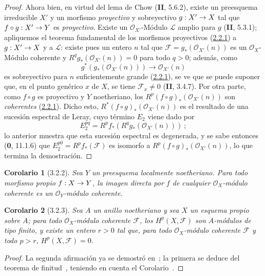 \documentclass[10pt,oneside,openany]{book}
\theoremstyle{egaenv}\newtheorem*{env}{---}
\theoremstyle{egastatement}
\newtheorem*{corollary}{Corolario}
\theoremstyle{egadescription}
\renewcommand{\to}{\mathchoice{\longrightarrow}{\rightarrow}{\rightarrow}{\rightarrow}}
\begin{document}
\begin{proof}
Ahora bien, en virtud del lema de Chow (\textbf{II}, 5.6.2), existe un preesquema
irreducible $X'$ y un morfismo \emph{proyectivo} y sobreyectivo
$g:X'\to X$ tal que $f\circ g:X'\to Y$ es \emph{proyectivo}. Existe un
$\mathcal O_{X'}$-Módulo $\mathcal L$ amplio para $g$ (\textbf{II}, 5.3.1);
apliquemos el teorema fundamental de los morfismos proyectivos
(\hyperref[III.2.2.1-fr]{2.2.1}) a $g:X'\to X$ y a $\mathcal L$:
existe pues un entero $n$ tal que
$\mathcal F=g_*(\mathcal O_{X'}(n))$ es un $\mathcal O_X$-Módulo coherente
y $R^qg_*(\mathcal O_{X'}(n))=0$ para todo $q>0$; además, como
\[
g^*(g_*(\mathcal O_{X'}(n)))\longrightarrow\mathcal O_{X'}(n)
\]
es sobreyectivo para $n$ suficientemente grande (\hyperref[III.2.2.1-fr]{2.2.1}), se
ve que se puede suponer que, en el punto genérico $x$ de $X$, se tiene
$\mathcal F_x\neq0$ (\textbf{II}, 3.4.7). Por otra parte, como $f\circ g$ es
proyectivo y $Y$ noetheriano, los
$R^p(f\circ g)_*(\mathcal O_{X'}(n))$ son \emph{coherentes}
(\hyperref[III.2.2.1-fr]{2.2.1}). Dicho esto,
$R^*(f\circ g)_*(\mathcal O_{X'}(n))$ es el resultado de una sucesión
espectral de Leray, cuyo término $E_2$ viene dado por
\[
E_2^{pq}=R^pf_*(R^qg_*(\mathcal O_{X'}(n)))~;
\]
lo anterior muestra que esta sucesión espectral es degenerada, y se sabe
entonces (\textbf{0}, 11.1.6) que $E_2^{p0}=R^pf_*(\mathcal F)$ es isomorfo a
$R^p(f\circ g)_*(\mathcal O_{X'}(n))$, lo que termina la demostración.
\end{proof}

\begin{corollary}[3.2.2]
\label{III.3.2.2}
\label{III.3.2.2-fr}
Sea $Y$ un preesquema localmente noetheriano.
Para todo morfismo propio $f:X\to Y$, la imagen directa por $f$ de cualquier $\mathcal O_X$-módulo coherente es un $\mathcal O_Y$-módulo coherente.
\end{corollary}

\begin{corollary}[3.2.3]
\label{III.3.2.3}
\label{III.3.2.3-fr}
Sea $A$ un anillo noetheriano y sea $X$ un esquema propio sobre $A$; para todo $\mathcal O_X$-módulo coherente $\mathcal F$, los $H^p(X,\mathcal F)$ son $A$-módulos de tipo finito, y existe un entero $r>0$ tal que, para todo $\mathcal O_X$-módulo coherente $\mathcal F$ y todo $p>r$, $H^p(X,\mathcal F)=0$.
\end{corollary}

\begin{proof}
La segunda afirmación ya se demostró en~; la primera se deduce del teorema de finitud~, teniendo en cuenta el Corolario~.
\end{proof}
\end{document}
